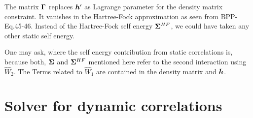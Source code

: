 \documentclass[11pt,a4paper]{report}
\begin{document}
The matrix $\bm{\Gamma}$ replaces $\bm{h}'$ as Lagrange parameter
for the density matrix constraint.  It vanishes in the Hartree-Fock
approximation as seen from
BPP-Eq.45-46\cite{bloechl13_prb88_25139}. Instead of the Hartree-Fock
self energy $\bm{\Sigma}^{HF}$, we could have taken any other static
self energy.


One may ask, where the self energy contribution from static
correlations is, because both, $\bm{\Sigma}$ and $\bm{\Sigma}^{HF}$
mentioned here refer to the second interaction using $\hat{W}_2$. The
Terms related to $\hat{W}_1$ are contained in the density matrix and
$\bar{\bm{h}}$.

\section{Solver for dynamic correlations}
\end{document}
